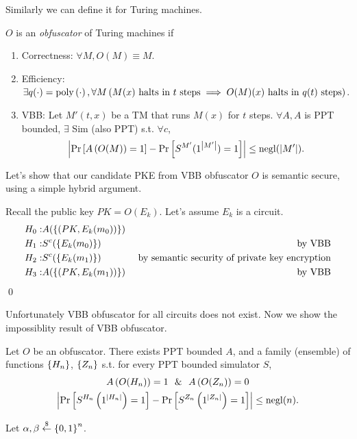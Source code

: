 Similarly we can define it for Turing machines.
\begin{definition}
	$O$ is an \emph{obfuscator} of Turing machines if %
	\begin{enumerate}
		\item
			Correctness:
	$\forall M, O(M) \equiv M$.
	\item
		Efficiency:
		$\exists q(\cdot) = \mathop{\mathrm{poly}}\left(\cdot\right), \forall M \left( M(x) \hbox{ halts in }t \hbox{ steps} \implies O(M)(x) \hbox{ halts in }q(t) \hbox{ steps}\right)$.
	\item
		VBB:
		Let $M'(t,x)$ be a TM that runs $M(x)$ for $t$ steps.
		$\forall A, A$ is PPT bounded, $\exists$ Sim (also PPT) s.t. $\forall c$,
		\[
			\left\vert\Pr\left[ A\left( O(M) \right) = 1\right] - \Pr\left[ S^{M'}(1^{\left\vert M'\right\vert}) = 1 \right]\right\vert \le \mathrm{negl}(\left\vert M'\right\vert).
		\]
	\end{enumerate}
\end{definition}

Let's show that our candidate PKE from VBB obfuscator $O$ is semantic secure, using a simple hybrid argument.

\proof
Recall the public key $PK=O(E_k)$.
Let's assume $E_k$ is a circuit.
\begin{align*}
	H_0 :& A(\left\{(PK, E_k(m_0))\right\}) & \\
	H_1 :& S^c(\left\{E_k(m_0)\right\}) & \hbox{ by VBB} \\
	H_2 :& S^c(\left\{E_k(m_1)\right\}) & \hbox{ by semantic security of private key encryption} \\
	H_3 :& A(\left\{(PK, E_k(m_1))\right\}) & \hbox{ by VBB}
\end{align*}
\qed

Unfortunately VBB obfuscator for all circuits does not exist. Now we show the impossiblity result of VBB obfuscator.
\begin{theorem}
	Let $O$ be an obfuscator.
	There exists PPT bounded $A$, and a family (ensemble) of functions $\left\{H_n\right\}$, $\left\{Z_n\right\}$ s.t.
	for every PPT bounded simulator $S$,
\begin{gather*}
	A\left( O(H_n) \right) = 1 \ \ \& \ \ A\left( O(Z_n) \right) = 0\\
	\left\vert\Pr\left[ S^{H_n} \left( 1^{\left\vert H_n\right\vert} \right) = 1 \right] - \Pr \left[ S^{Z_n} \left(1^{\left\vert Z_n\right\vert}\right) =1 \right]\right\vert \le\mathrm{negl}(n).
\end{gather*}
\end{theorem}

\proof
Let $\alpha, \beta \overset{\$}{\leftarrow} \left\{0,1\right\}^n$.

